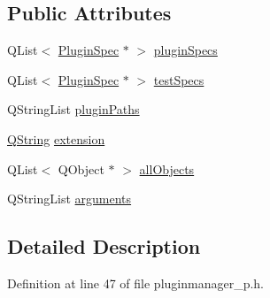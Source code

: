 \subsection*{\-Public \-Attributes}
\begin{DoxyCompactItemize}
\item 
\-Q\-List$<$ \hyperlink{class_extension_system_1_1_plugin_spec}{\-Plugin\-Spec} $\ast$ $>$ \hyperlink{class_extension_system_1_1_internal_1_1_plugin_manager_private_a1654aed9c8c9d015cc3ef398f405613e}{plugin\-Specs}
\item 
\-Q\-List$<$ \hyperlink{class_extension_system_1_1_plugin_spec}{\-Plugin\-Spec} $\ast$ $>$ \hyperlink{class_extension_system_1_1_internal_1_1_plugin_manager_private_a25ce55fe8bc3538c6fe2c5ac18be1f66}{test\-Specs}
\item 
\-Q\-String\-List \hyperlink{class_extension_system_1_1_internal_1_1_plugin_manager_private_aab8385c194dea0ca7100ace14cd9ce29}{plugin\-Paths}
\item 
\hyperlink{group___u_a_v_objects_plugin_gab9d252f49c333c94a72f97ce3105a32d}{\-Q\-String} \hyperlink{class_extension_system_1_1_internal_1_1_plugin_manager_private_ac92959afcbee3882ac4df6bf9d00d6b2}{extension}
\item 
\-Q\-List$<$ \-Q\-Object $\ast$ $>$ \hyperlink{class_extension_system_1_1_internal_1_1_plugin_manager_private_a33d08f94e70bb4ecf53a00ed840f02a1}{all\-Objects}
\item 
\-Q\-String\-List \hyperlink{class_extension_system_1_1_internal_1_1_plugin_manager_private_ae4cd1bb87340f771e64431172280191c}{arguments}
\end{DoxyCompactItemize}


\subsection{\-Detailed \-Description}


\-Definition at line 47 of file pluginmanager\-\_\-p.\-h.



